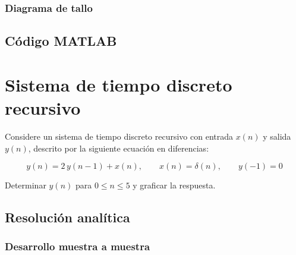 \documentclass[../Main_Include.tex]{subfiles}
\begin{document}
\subsubsection*{Diagrama de tallo}

\subsection*{Código MATLAB}



\newpage
\section{Sistema de tiempo discreto recursivo}

Considere un sistema de tiempo discreto recursivo con entrada $x(n)$
y salida $y(n)$, descrito por la siguiente ecuación en diferencias:

\[
    y(n) = 2\,y(n-1) + x(n), \qquad x(n) = \delta(n), \qquad y(-1) = 0
\]

Determinar $y(n)$ para $0 \le n \le 5$ y graficar la respuesta.

\subsection*{Resolución analítica}

\subsubsection*{Desarrollo muestra a muestra}
\end{document}
